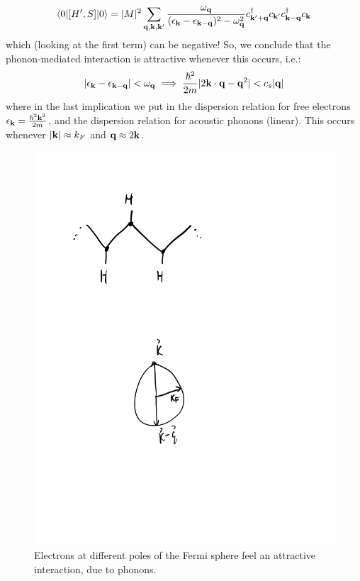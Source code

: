 \begin{equation}
    \langle 0 \rvert[H', S]\lvert 0 \rangle = \lvert M \rvert^2 \sum_{\mathbf{q}, \mathbf{k}, \mathbf{k}'} \frac{\omega_{\mathbf{q}}}{(\epsilon_{\mathbf{k}} - \epsilon_{\mathbf{k} - \mathbf{q}})^2 - \omega_{\mathbf{q}}^2}c^\dagger_{\mathbf{k}' + \mathbf{q}}c_{\mathbf{k}'}c^\dagger_{\mathbf{k} - \mathbf{q}}c_{\mathbf{k}}
\end{equation}
which (looking at the first term) can be negative! So, we conclude that the phonon-mediated interaction is attractive whenever this occurs, i.e.:
\begin{equation}
    \lvert \epsilon_{\mathbf{k}} - \epsilon_{\mathbf{k} - \mathbf{q}} \rvert < \omega_{\mathbf{q}} \implies \frac{\hbar^2}{2m}\lvert 2\mathbf{k} \cdot \mathbf{q} - \mathbf{q}^2 \rvert < c_s\lvert \mathbf{q} \rvert
\end{equation}
where in the last implication we put in the dispersion relation for free electrons $\epsilon_{\mathbf{k}} = \frac{\hbar^2\mathbf{k}^2}{2m}$, and the dispersion relation for acoustic phonons (linear). This occurs whenever $\lvert \mathbf{k} \rvert \approx k_F$ and $\mathbf{q} \approx 2\mathbf{k}$. 

\begin{figure}[htbp]
    \centering
    \includegraphics[scale=0.7]{Images/fig-attractingelectrons.pdf}
    \caption{Electrons at different poles of the Fermi sphere feel an attractive interaction, due to phonons.}
    \label{fig-attractingelectrons}
\end{figure}

